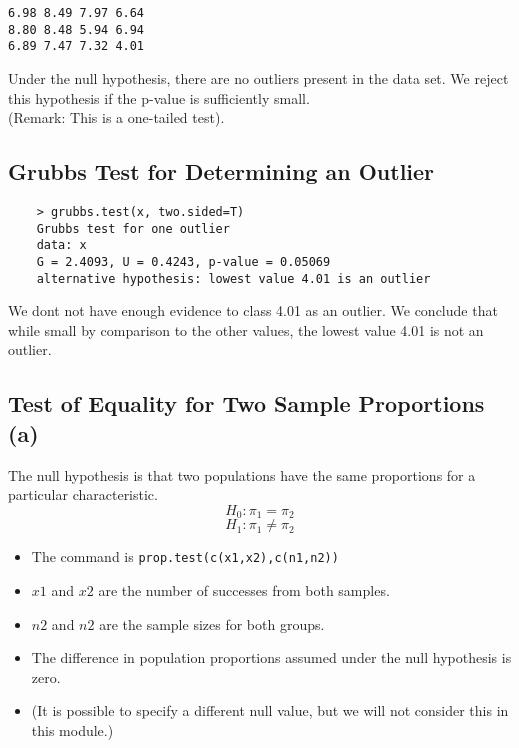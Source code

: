 \documentclass[]{report}
\begin{document}
\begin{verbatim}
6.98 8.49 7.97 6.64
8.80 8.48 5.94 6.94
6.89 7.47 7.32 4.01
\end{verbatim}

Under the null hypothesis, there are no outliers present in the data set. 
We reject this hypothesis if the p-value is sufficiently small.\\
(Remark: This is a one-tailed test).



\subsection{Grubbs Test for Determining an Outlier}
\begin{framed}
	\begin{verbatim}
	> grubbs.test(x, two.sided=T)
	Grubbs test for one outlier
	data: x
	G = 2.4093, U = 0.4243, p-value = 0.05069
	alternative hypothesis: lowest value 4.01 is an outlier
	\end{verbatim}
\end{framed}
We dont not have enough evidence to class 4.01 as an outlier.
We conclude that while small by comparison to the other values, the lowest value 4.01 is not an outlier.






\subsection{Test of Equality for Two Sample Proportions (a)}
The null hypothesis is that two populations have the same proportions for a particular characteristic.
\[H_0 : \pi_1 = \pi_2 \]
\[H_1 : \pi_1 \neq \pi_2 \]
\begin{itemize}
	\item The command is \texttt{prop.test(c(x1,x2),c(n1,n2))}
	\item $x1$ and $x2$ are the number of successes from both samples.
	\item $n2$ and $n2$ are the sample sizes for both groups.
	\item The difference in population proportions assumed under the null hypothesis is zero.
	\item (It is possible to specify a different null value, but we will not consider this in this module.)
\end{itemize}
\end{document}
